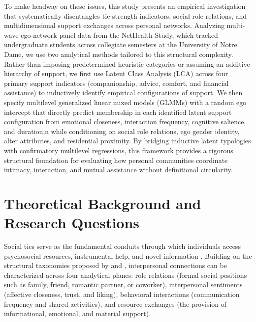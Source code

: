 \documentclass[12pt]{article}
\begin{document}
To make headway on these issues, this study presents an empirical investigation that systematically disentangles tie-strength indicators, social role relations, and multidimensional support exchanges across personal networks. Analyzing multi-wave ego-network panel data from the NetHealth Study, which tracked undergraduate students across collegiate semesters at the University of Notre Dame, we use two analytical methods tailored to this structural complexity. Rather than imposing predetermined heuristic categories or assuming an additive hierarchy of support, we first use Latent Class Analysis (LCA) across four primary support indicators (companionship, advice, comfort, and financial assistance) to inductively identify empirical configurations of support. We then specify multilevel generalized linear mixed models (GLMMs) with a random ego intercept that directly predict membership in each identified latent support configuration from emotional closeness, interaction frequency, cognitive salience, and duration,n while conditioning on social role relations, ego gender identity, alter attributes, and residential proximity. By bridging inductive latent typologies with confirmatory multilevel regressions, this framework provides a rigorous structural foundation for evaluating how personal communities coordinate intimacy, interaction, and mutual assistance without definitional circularity.

\section{Theoretical Background and Research Questions}

Social ties serve as the fundamental conduits through which individuals access psychosocial resources, instrumental help, and novel information \citep{borgatti2009network, lin2001social}. Building on the structural taxonomies proposed by \citet{borgatti2009network} and \citet{kitts2014beyond}, interpersonal connections can be characterized across four analytical planes: role relations (formal social positions such as family, friend, romantic partner, or coworker), interpersonal sentiments (affective closeness, trust, and liking), behavioral interactions (communication frequency and shared activities), and resource exchanges (the provision of informational, emotional, and material support).
\end{document}
